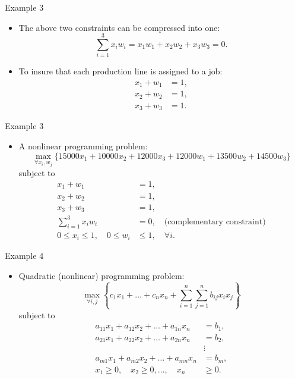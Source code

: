 \documentclass[aspectratio=169,hyperref,UTF8,CJK]{beamer}
\begin{document}
\begin{frame}{Example 3}
  \begin{itemize}
    \item The above two constraints can be compressed into one:
      \begin{equation}\tag{13}
        \sum_{i=1}^{3}x_iw_i=x_1w_1+x_2w_2+x_3w_3=0.
      \end{equation}
    \item To insure that each production line is assigned to a job:
      \begin{align*}
        x_1+w_1&=1,\\
        x_2+w_2&=1,\\
        x_3+w_3&=1.
      \end{align*}
  \end{itemize}
\end{frame}

\begin{frame}{Example 3}
  \small
  \begin{itemize}
    \item A nonlinear programming problem:
      \begin{equation*}
        \max_{\forall x_i,w_j}\{15000x_1+10000x_2+12000x_3+12000w_1+13500w_2+14500w_3\}
      \end{equation*}
      subject to
      \begin{align*}
        x_1+w_1&=1,\\
        x_2+w_2&=1,\\
        x_3+w_3&=1,\\
        \sum_{i=1}^{3}x_iw_i&=0,\quad\text{(complementary constraint)}\\
        0\le x_i\le1,\quad 0\le w_i&\le1,\quad\forall i.
      \end{align*}
  \end{itemize}
\end{frame}

\begin{frame}{Example 4}
  \small
  \begin{itemize}
    \item Quadratic (nonlinear) programming problem:
      \begin{equation*}
        \max_{\forall i,j}\left\{c_1x_1+\ldots+c_nx_n+\sum_{i=1}^{n}\sum_{j=1}^{n}b_{ij}x_ix_j\right\}
      \end{equation*}
      subject to
      \begin{align*}
        a_{11}x_1+a_{12}x_2+\ldots+a_{1n}x_n&=b_1,\\
        a_{21}x_1+a_{22}x_2+\ldots+a_{2n}x_n&=b_2,\\
        &\vdots\\
        a_{m1}x_1+a_{m2}x_2+\ldots+a_{mn}x_n&=b_m,\\
        x_1\ge0,\quad x_2\ge0,\ldots,\quad x_n&\ge0.
      \end{align*}
  \end{itemize}
\end{frame}
\end{document}
